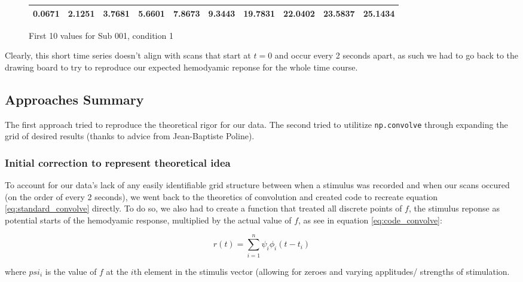 \documentclass[11pt]{article}
\begin{document}
\vspace{5mm}

\begin{figure}[ht]
\begin{center}
\begin{tabular}{|cccccccccc|}
  \hline
0.0671 &
2.1251 &
3.7681 &
5.6601 &
7.8673 &
9.3443 &
19.7831 &
22.0402 &
23.5837 &
25.1434 \\
 \hline

  \end{tabular}
   \caption{First 10 values for Sub 001, condition 1}
  \label{table:cond1}
\end{center}
\end{figure}
 
 Clearly, this short time series doesn't align with scans that start at $t=0$ and occur every 2 seconds apart, as such we had to go back to the drawing board to try to reproduce our expected hemodyamic reponse for the whole time course.



\subsection{Approaches Summary}
The first approach tried to reproduce the theoretical rigor for our data. The second tried to utilitize \texttt{np.convolve} through expanding the grid of desired results (thanks to advice from Jean-Baptiste Poline).




\subsubsection{Initial correction to represent theoretical idea}
To account for our data's lack of any easily identifiable grid structure between when a stimulus was recorded and when our scans occured (on the order of every 2 seconds), we went back to the theoretics of convolution and created code to recreate equation \ref{eq:standard_convolve} directly. To do so, we also had to create a function that treated all discrete points of $f$, the stimulus reponse as potential starts of the hemodyamic response, multiplied by the actual value of $f$, as see in equation  \ref{eq:code_convolve}:

\begin{equation} \label{eq:code_convolve}
r(t)= \sum_{i=1}^n \psi_{i} \phi_{i}(t-t_i)
\end{equation}

where $psi_{i}$ is the value of $f$ at the $i$th element in the stimulis vector (allowing for zeroes and varying applitudes/ strengths of stimulation.
\end{document}
